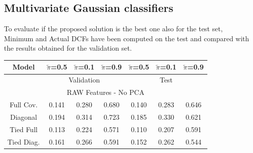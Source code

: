 \documentclass[12pt,a4paper]{article}
\begin{document}
\subsection{Multivariate Gaussian classifiers}

To evaluate if the proposed solution is the best one also for the test set,
Minimum and Actual DCFs have been computed on the test and compared with the results obtained for the validation set.

\begin{center}
    \renewcommand{\arraystretch}{1.2}
    \begin{tabular}{c|ccc|ccc}

        Model      & \(\tilde{\pi}\)=0.5            & \(\tilde{\pi}\)=0.1      & \(\tilde{\pi}\)=0.9  & \(\tilde{\pi}\)=0.5  & \(\tilde{\pi}\)=0.1  & \(\tilde{\pi}\)=0.9   \\ [0.5ex]

        \hline
                   & \multicolumn{3}{c|}{Validation} & \multicolumn{3}{c}{Test}                                                                                              \\

        \hline
        \multicolumn{7}{c}{RAW Features - No PCA}                                                                                                                           \\
        \hline
        Full Cov.  & 0.141                          & 0.280                    & 0.680                & 0.140                & 0.283                & 0.646                 \\
        Diagonal   & 0.194                          & 0.314                    & 0.723                & 0.185                & 0.330                & 0.621                 \\
        Tied Full  & {\color{red} 0.113 }           & {\color{red} 0.224 }     & 0.571                & {\color{red} 0.110 } & {\color{red} 0.207 } & 0.591                 \\
        Tied Diag. & 0.161                          & 0.266                    & 0.591                & 0.152                & 0.262                & {\color{blue} 0.544 } \\


\end{tabular}
\end{center}
\end{document}
